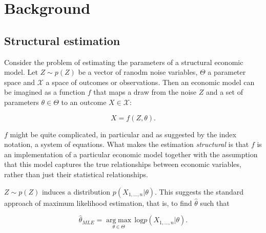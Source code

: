 
\section{Background} %
\label{sec:background}

\subsection{Structural estimation}
\label{sec:structural_estimation}

Consider the problem of estimating the parameters of a structural economic model.
Let $Z \sim p(Z)$ be a vector of ranodm noise variables, $\Theta$ a parameter space and $\mathcal{X}$ a space of outcomes or observations.
Then an economic model can be imagined as a function $f$ that maps a draw from the noise $Z$ and a set of parameters $\theta \in \Theta$ to an outcome $X \in \mathcal{X}$:

\begin{equation}
    X = f(Z, \theta).
\end{equation}

$f$ might be quite complicated, in particular and as suggested by the index notation, a system of equations. %
What makes the estimation \textit{structural} is that $f$ is an implementation of a particular economic model together with the assumption that this model captures the true relationships between economic variables, rather than just their statistical relationships. %

$Z \sim p(Z)$ induces a distribution $p(X_{1, \dots, n}|\theta)$.
This suggests the standard approach of maximum likelihood estimation, that is, to find $\hat{\theta}$ such that

\begin{equation}
    \hat{\theta}_{MLE} = \underset{\theta\in\Theta}{\operatorname{arg\;max}}\,\text{log} p(X_{1, \dots, n}|\theta).
\end{equation}

